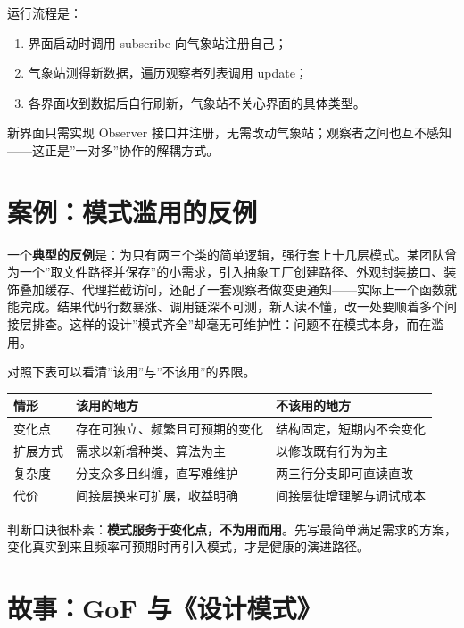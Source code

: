 \documentclass[12pt,a4paper,twoside,openany]{ctexbook}
\numberwithin{figure}{chapter}
\numberwithin{table}{chapter}
\providecommand{\tightlist}{\setlength{\itemsep}{0pt}\setlength{\parskip}{0pt}}
\newcounter{none}
\begin{document}
运行流程是：

\begin{enumerate}
\def\labelenumi{\arabic{enumi}.}
\tightlist
\item
  界面启动时调用 subscribe 向气象站注册自己；
\item
  气象站测得新数据，遍历观察者列表调用 update；
\item
  各界面收到数据后自行刷新，气象站不关心界面的具体类型。
\end{enumerate}

新界面只需实现 Observer
接口并注册，无需改动气象站；观察者之间也互不感知------这正是''一对多''协作的解耦方式。

\section{案例：模式滥用的反例}\label{ux6848ux4f8bux6a21ux5f0fux6ee5ux7528ux7684ux53cdux4f8b}

一个\textbf{典型的反例}是：为只有两三个类的简单逻辑，强行套上十几层模式。某团队曾为一个''取文件路径并保存''的小需求，引入抽象工厂创建路径、外观封装接口、装饰叠加缓存、代理拦截访问，还配了一套观察者做变更通知------实际上一个函数就能完成。结果代码行数暴涨、调用链深不可测，新人读不懂，改一处要顺着多个间接层排查。这样的设计''模式齐全''却毫无可维护性：问题不在模式本身，而在滥用。

对照下表可以看清''该用''与''不该用''的界限。

{\def\LTcaptype{none} %
\begin{longtable}[]{@{}lll@{}}
\toprule\noalign{}
情形 & 该用的地方 & 不该用的地方 \\
\midrule\noalign{}
\endhead
\bottomrule\noalign{}
\endlastfoot
变化点 & 存在可独立、频繁且可预期的变化 & 结构固定，短期内不会变化 \\
扩展方式 & 需求以新增种类、算法为主 & 以修改既有行为为主 \\
复杂度 & 分支众多且纠缠，直写难维护 & 两三行分支即可直读直改 \\
代价 & 间接层换来可扩展，收益明确 & 间接层徒增理解与调试成本 \\
\end{longtable}
}

判断口诀很朴素：\textbf{模式服务于变化点，不为用而用}。先写最简单满足需求的方案，变化真实到来且频率可预期时再引入模式，才是健康的演进路径。

\section{故事：GoF
与《设计模式》}\label{ux6545ux4e8bgof-ux4e0eux8bbeux8ba1ux6a21ux5f0f}
\end{document}
